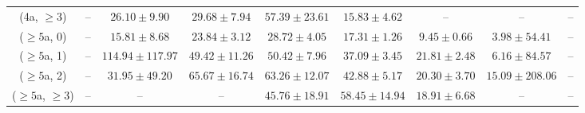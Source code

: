 \begin{table}[h!]
{\begin{tabular}{ccccccccc}
	(4a, $\ge3$) & -- & $26.10\pm 9.90$ & $29.68\pm 7.94$ & $57.39\pm 23.61$ & $15.83\pm 4.62$ & -- & -- & -- \\[0.5ex] 
	($\ge5$a, 0) & -- & $15.81\pm 8.68$ & $23.84\pm 3.12$ & $28.72\pm 4.05$ & $17.31\pm 1.26$ & $9.45\pm 0.66$ & $3.98\pm 54.41$ & -- \\[0.5ex] 
	($\ge5$a, 1) & -- & $114.94\pm 117.97$ & $49.42\pm 11.26$ & $50.42\pm 7.96$ & $37.09\pm 3.45$ & $21.81\pm 2.48$ & $6.16\pm 84.57$ & -- \\[0.5ex] 
	($\ge5$a, 2) & -- & $31.95\pm 49.20$ & $65.67\pm 16.74$ & $63.26\pm 12.07$ & $42.88\pm 5.17$ & $20.30\pm 3.70$ & $15.09\pm 208.06$ & -- \\[0.5ex] 
	($\ge5$a, $\ge3$) & -- & -- & -- & $45.76\pm 18.91$ & $58.45\pm 14.94$ & $18.91\pm 6.68$ & -- & -- \\[0.5ex] 
	\hline
	\hline
\end{tabular}}
\end{table}
